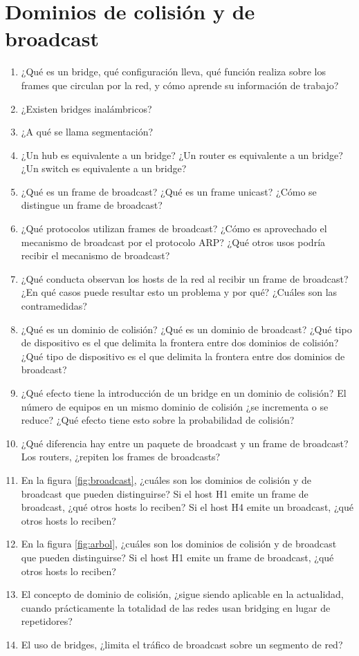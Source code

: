 \section{Dominios de colisión y de broadcast}
\label{sub:}
\begin{enumerate}
\item ¿Qué es un bridge, qué configuración lleva, qué función realiza sobre los frames que circulan por la red, y cómo aprende su información de trabajo? 
\item ¿Existen bridges inalámbricos? 
\item ¿A qué se llama segmentación?
\item ¿Un hub es equivalente a un bridge? ¿Un router es equivalente a un bridge? ¿Un switch es equivalente a un bridge? 
\item ¿Qué es un frame de broadcast? ¿Qué es un frame unicast? ¿Cómo se distingue un frame de broadcast? 
\item ¿Qué protocolos utilizan frames de broadcast? ¿Cómo es aprovechado el mecanismo de broadcast por el protocolo ARP? ¿Qué otros usos podría recibir el mecanismo de broadcast?
\item ¿Qué conducta observan los hosts de la red al recibir un frame de broadcast? ¿En qué casos puede resultar esto un problema y por qué? ¿Cuáles son las contramedidas?
\item ¿Qué es un dominio de colisión?  ¿Qué es un dominio de broadcast? ¿Qué tipo de dispositivo es el que delimita la frontera entre dos dominios de colisión?  ¿Qué tipo de dispositivo es el que delimita la frontera entre dos dominios de broadcast? 
\item ¿Qué efecto tiene la introducción de un bridge en un dominio de colisión? El número de equipos en un mismo dominio de colisión ¿se incrementa o se reduce? ¿Qué efecto tiene esto sobre la probabilidad de colisión?
\item ¿Qué diferencia hay entre un paquete de broadcast y un frame de broadcast? Los routers, ¿repiten los frames de broadcasts?
\item En la figura \ref{fig:broadcast}, ¿cuáles son los dominios de colisión y de broadcast que pueden distinguirse? Si el host H1 emite un frame de broadcast, ¿qué otros hosts lo reciben? Si el host H4 emite un broadcast, ¿qué otros hosts lo reciben?
\item En la figura \ref{fig:arbol}, ¿cuáles son los dominios de colisión y de broadcast que pueden distinguirse? Si el host H1 emite un frame de broadcast, ¿qué otros hosts lo reciben? 
\item El concepto de dominio de colisión, ¿sigue siendo aplicable en la actualidad, cuando prácticamente la totalidad de las redes usan bridging en lugar de repetidores? 
\item El uso de bridges, ¿limita el tráfico de broadcast sobre un segmento de red? 
\end{enumerate}


